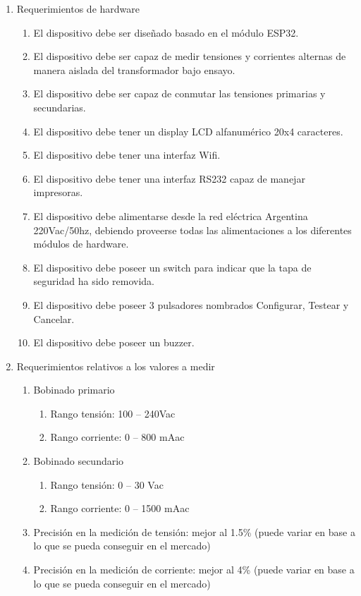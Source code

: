 \documentclass[11pt]{charter}
\begin{document}
\begin{enumerate}
\item Requerimientos de hardware
	\begin{enumerate}
	\item El dispositivo debe ser diseñado basado en el módulo ESP32.
	\item El dispositivo debe ser capaz de medir tensiones y corrientes alternas de manera aislada del transformador bajo ensayo.
	\item El dispositivo debe ser capaz de conmutar las tensiones primarias y secundarias.
	\item El dispositivo debe tener un display LCD alfanumérico 20x4 caracteres.
	\item El dispositivo debe tener una interfaz Wifi.
	\item El dispositivo debe tener una interfaz RS232 capaz de manejar impresoras.
	\item El dispositivo debe alimentarse desde la red eléctrica Argentina 220Vac/50hz, debiendo proveerse todas las alimentaciones a los diferentes módulos de hardware.
	\item El dispositivo debe poseer un switch para indicar que la tapa de seguridad ha sido removida.
	\item El dispositivo debe poseer 3 pulsadores nombrados Configurar, Testear y Cancelar.
	\item El dispositivo debe poseer un buzzer.
	\end{enumerate}
\item Requerimientos relativos a los valores a medir
	\begin{enumerate}
	\item Bobinado primario
		\begin{enumerate}
		\item Rango tensión: 100 – 240Vac
		\item Rango corriente: 0 – 800 mAac
		\end{enumerate}
	\item Bobinado secundario
		\begin{enumerate}
		\item Rango tensión: 0 – 30 Vac
		\item Rango corriente: 0 – 1500 mAac
		\end{enumerate}
	\item Precisión en la medición de tensión: mejor al 1.5\% (puede variar en base a lo que se pueda conseguir en el mercado)
	\item Precisión en la medición de corriente: mejor al 4\% (puede variar en base a lo que se pueda conseguir en el mercado)

\end{enumerate}
\end{enumerate}
\end{document}
